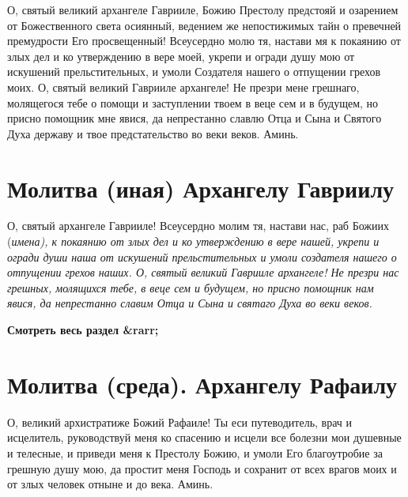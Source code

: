 О, святый великий архангеле Гаврииле, Божию Престолу предстояй и озарением от Божественного света осиянный, ведением же непостижимых тайн о превечней премудрости Его просвещенный! Всеусердно молю тя, настави мя к покаянию от злых дел и ко утверждению в вере моей, укрепи и огради душу мою от искушений прельстительных, и умоли Создателя нашего о отпущении грехов моих. О, святый великий Гаврииле архангеле! Не презри мене грешнаго, молящегося тебе о помощи и заступлении твоем в веце сем и в будущем, но присно помощник мне явися, да непрестанно славлю Отца и Сына и Святого Духа державу и твое предстательство во веки веков. Аминь.

\section{Молитва (иная) Архангелу Гавриилу}



О, святый архангеле Гаврииле! Всеусердно молим тя, настави нас, раб Божиих (\itshape имена\normalfont{}), к покаянию от злых дел и ко утверждению в вере нашей, укрепи и огради души наша от искушений прельстительных и умоли создателя нашего о отпущении грехов наших. О, святый великий Гаврииле архангеле! Не презри нас грешных, молящихся тебе, в веце сем и будущем, но присно помощник нам явися, да непрестанно славим Отца и Сына и святаго Духа во веки веков.


\mychapterending




\bfseries Смотреть весь раздел &rarr;\normalfont{} 

\section{Молитва (среда).     Архангелу Рафаилу}



О, великий архистратиже Божий Рафаиле! Ты еси путеводитель, врач и исцелитель, руководствуй меня ко спасению и исцели все болезни мои душевные и телесные, и приведи меня к Престолу Божию, и умоли Его благоутробие за грешную душу мою, да простит меня Господь и сохранит от всех врагов моих и от злых человек отныне и до века. Аминь.


\mychapterending




